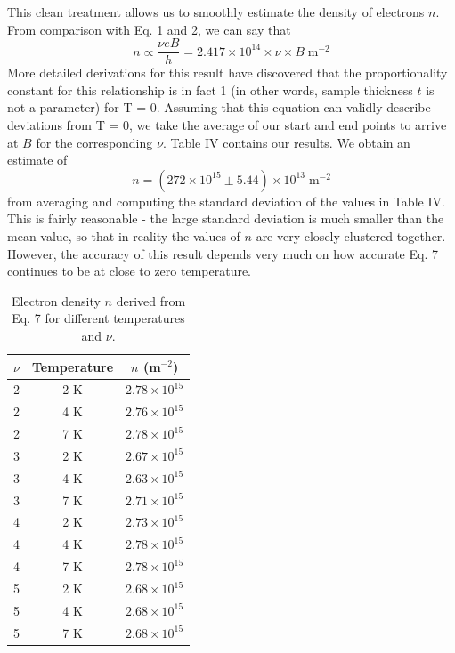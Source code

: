 \documentclass[aps,prl,nofootinbib,twocolumn,superscriptaddress,groupedaddress]{revtex4}  %
\begin{document}
This clean treatment allows us to smoothly estimate the density of electrons $n$. From comparison with Eq. 1 and 2, we can say that 
\begin{equation}
n \propto \frac{\nu e B}{h} = 2.417 \times 10^{14}\times \nu \times B \; \textrm{m}^{-2}
\end{equation}
More detailed derivations for this result\cite{nobel} have discovered that the proportionality constant for this relationship is in fact 1 (in other words, sample thickness $t$ is not a parameter) for T = 0. Assuming that this equation can validly describe deviations from T = 0, we take the average of our start and end points to arrive at $B$ for the corresponding $\nu$. Table IV contains our results. We obtain an estimate of 
$$ n = (272 \times 10^{15} \pm 5.44) \times 10^{13} \; \mathrm{m}^{-2}$$
from averaging and computing the standard deviation of the values in Table IV. This is fairly reasonable - the large standard deviation is much smaller than the mean value, so that in reality the values of $n$ are very closely clustered together. However, the accuracy of this result depends very much on how accurate Eq. 7 continues to be at close to zero temperature.
\begin{table}[b]
\caption{Electron density $n$ derived from Eq. 7 for different temperatures and $\nu$.}
\begin{ruledtabular}
\begin{tabular}{ccc}
$\nu$ & Temperature & $n$ (m$^{-2}$)\\
\hline
\hline
2 & 2 K& $2.78 \times 10^{15}$ \\
2 & 4 K& $2.76 \times 10^{15}$ \\
2 & 7 K& $2.78 \times 10^{15}$ \\
3 & 2 K& $2.67 \times 10^{15}$ \\
3 & 4 K& $2.63 \times 10^{15}$ \\
3 & 7 K& $2.71 \times 10^{15}$ \\
4 & 2 K& $2.73 \times 10^{15}$ \\
4 & 4 K& $2.78 \times 10^{15}$ \\
4 & 7 K& $2.78 \times 10^{15}$ \\
5 & 2 K& $2.68 \times 10^{15}$ \\
5 & 4 K& $2.68 \times 10^{15}$ \\
5 & 7 K& $2.68 \times 10^{15}$ \\
\end{tabular}
\end{ruledtabular}
\end{table}
\end{document}
